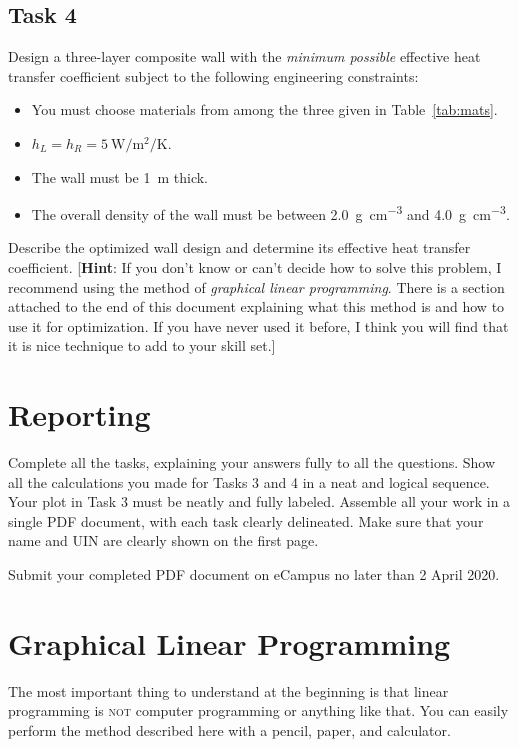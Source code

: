 \documentclass{article}
\begin{document}
\subsection*{Task 4}
Design a three-layer composite wall with the \textit{minimum possible} effective heat transfer coefficient
subject to the following engineering constraints:
\begin{itemize}
    \item You must choose materials from among the three given in Table~\ref{tab:mats}.
    \item $h_L = h_R = \SI{5}{\watt\per\meter\squared\per\kelvin}$.
    \item The wall must be \SI{1}{\meter} thick.
    \item The overall density of the wall must be between
        \SI{2.0}{\gram\per\centi\meter\cubed} and
        \SI{4.0}{\gram\per\centi\meter\cubed}.
\end{itemize}
Describe the optimized wall design and determine its effective heat transfer coefficient.
[\textbf{Hint}: If you don't know or can't decide how to solve this problem, I recommend
using the method of \textit{graphical linear programming}. There is a section attached to
the end of
this document explaining what this method is and how to use it for optimization.  If you
have never used it before, I think you will find that it is nice technique to add to your
skill set.]

\section*{Reporting}
Complete all the tasks, explaining your answers fully to all the questions.  Show all the calculations
you made for Tasks 3 and 4 in a neat and logical sequence. Your plot in Task 3 must be neatly and fully
labeled.  Assemble all your work in a single PDF document, with each task clearly delineated.
Make sure that your name and UIN are clearly shown on the first page.

Submit your completed PDF document on eCampus no later than 2 April 2020.

\newpage
\section*{Graphical Linear Programming}
The most important thing to understand at the beginning is that linear programming is \textsc{not}
computer programming or anything like that.  You can easily perform the method described here with
a pencil, paper, and calculator.
\end{document}
